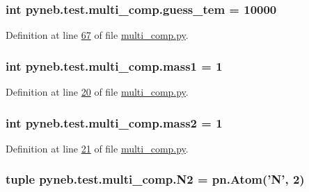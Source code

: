 \hypertarget{namespacepyneb_1_1test_1_1multi__comp_a727ee7c8e06d8c8f88ee5ca2989968a2}{
\subsubsection[{guess\-\_\-tem}]{\setlength{\rightskip}{0pt plus 5cm}int pyneb.\-test.\-multi\-\_\-comp.\-guess\-\_\-tem = 10000}}\label{namespacepyneb_1_1test_1_1multi__comp_a727ee7c8e06d8c8f88ee5ca2989968a2}


Definition at line \hyperlink{multi__comp_8py_source_l00067}{67} of file \hyperlink{multi__comp_8py_source}{multi\-\_\-comp.\-py}.

\hypertarget{namespacepyneb_1_1test_1_1multi__comp_a0f4f1d8d7cca8ff5626b7e39261d92d5}{
\subsubsection[{mass1}]{\setlength{\rightskip}{0pt plus 5cm}int pyneb.\-test.\-multi\-\_\-comp.\-mass1 = 1}}\label{namespacepyneb_1_1test_1_1multi__comp_a0f4f1d8d7cca8ff5626b7e39261d92d5}


Definition at line \hyperlink{multi__comp_8py_source_l00020}{20} of file \hyperlink{multi__comp_8py_source}{multi\-\_\-comp.\-py}.

\hypertarget{namespacepyneb_1_1test_1_1multi__comp_ad8cdd898f34b451cac9f738570b8fde6}{
\subsubsection[{mass2}]{\setlength{\rightskip}{0pt plus 5cm}int pyneb.\-test.\-multi\-\_\-comp.\-mass2 = 1}}\label{namespacepyneb_1_1test_1_1multi__comp_ad8cdd898f34b451cac9f738570b8fde6}


Definition at line \hyperlink{multi__comp_8py_source_l00021}{21} of file \hyperlink{multi__comp_8py_source}{multi\-\_\-comp.\-py}.

\hypertarget{namespacepyneb_1_1test_1_1multi__comp_a7ee3bebe71b0ebfd1ae4e1026bf854d2}{
\subsubsection[{N2}]{\setlength{\rightskip}{0pt plus 5cm}tuple pyneb.\-test.\-multi\-\_\-comp.\-N2 = pn.\-Atom('N', 2)}}\label{namespacepyneb_1_1test_1_1multi__comp_a7ee3bebe71b0ebfd1ae4e1026bf854d2}


